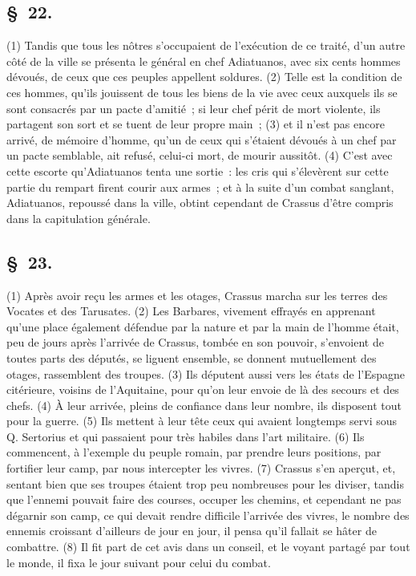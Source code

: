 \documentclass[french,twoside]{book} %
\begin{document}
\subsection[{§ 22.}]{ \textsc{§ 22.} }
\noindent (1) Tandis que tous les nôtres s’occupaient de l’exécution de ce traité, d’un autre côté de la ville se présenta le général en chef Adiatuanos, avec six cents hommes dévoués, de ceux que ces peuples appellent soldures. (2) Telle est la condition de ces hommes, qu’ils jouissent de tous les biens de la vie avec ceux auxquels ils se sont consacrés par un pacte d’amitié ; si leur chef périt de mort violente, ils partagent son sort et se tuent de leur propre main ; (3) et il n’est pas encore arrivé, de mémoire d’homme, qu’un de ceux qui s’étaient dévoués à un chef par un pacte semblable, ait refusé, celui-ci mort, de mourir aussitôt. (4) C'est avec cette escorte qu’Adiatuanos tenta une sortie : les cris qui s’élevèrent sur cette partie du rempart firent courir aux armes ; et à la suite d’un combat sanglant, Adiatuanos, repoussé dans la ville, obtint cependant de Crassus d’être compris dans la capitulation générale.
\subsection[{§ 23.}]{ \textsc{§ 23.} }
\noindent (1) Après avoir reçu les armes et les otages, Crassus marcha sur les terres des Vocates et des Tarusates. (2) Les Barbares, vivement effrayés en apprenant qu’une place également défendue par la nature et par la main de l’homme était, peu de jours après l’arrivée de Crassus, tombée en son pouvoir, s’envoient de toutes parts des députés, se liguent ensemble, se donnent mutuellement des otages, rassemblent des troupes. (3) Ils députent aussi vers les états de l’Espagne citérieure, voisins de l’Aquitaine, pour qu’on leur envoie de là des secours et des chefs. (4) À leur arrivée, pleins de confiance dans leur nombre, ils disposent tout pour la guerre. (5) Ils mettent à leur tête ceux qui avaient longtemps servi sous Q. Sertorius et qui passaient pour très habiles dans l’art militaire. (6) Ils commencent, à l’exemple du peuple romain, par prendre leurs positions, par fortifier leur camp, par nous intercepter les vivres. (7) Crassus s’en aperçut, et, sentant bien que ses troupes étaient trop peu nombreuses pour les diviser, tandis que l’ennemi pouvait faire des courses, occuper les chemins, et cependant ne pas dégarnir son camp, ce qui devait rendre difficile l’arrivée des vivres, le nombre des ennemis croissant d’ailleurs de jour en jour, il pensa qu’il fallait se hâter de combattre. (8) Il fit part de cet avis dans un conseil, et le voyant partagé par tout le monde, il fixa le jour suivant pour celui du combat.
\end{document}
